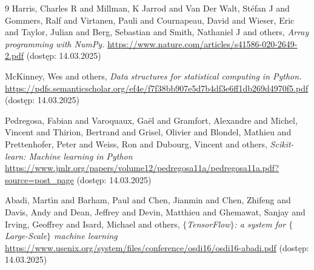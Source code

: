 \documentclass{SGGW-thesis}
\begin{document}
\begin{thebibliography}{9}
Harris, Charles R and Millman, K Jarrod and Van Der Walt, St{\'e}fan J and Gommers, Ralf and Virtanen, Pauli and Cournapeau, David and Wieser, Eric and Taylor, Julian and Berg, Sebastian and Smith, Nathaniel J and others, \textit{Array programming with NumPy.} \url{https://www.nature.com/articles/s41586-020-2649-2.pdf} (dostęp: 14.03.2025)

McKinney, Wes and others, \textit{Data structures for statistical computing in Python.} \url{https://pdfs.semanticscholar.org/ef4e/f7f38bb907e5d7b4df3e6ff1db269d4970f5.pdf} (dostęp: 14.03.2025)

Pedregosa, Fabian and Varoquaux, Ga{\"e}l and Gramfort, Alexandre and Michel, Vincent and Thirion, Bertrand and Grisel, Olivier and Blondel, Mathieu and Prettenhofer, Peter and Weiss, Ron and Dubourg, Vincent and others, \textit{Scikit-learn: Machine learning in Python} \url{https://www.jmlr.org/papers/volume12/pedregosa11a/pedregosa11a.pdf?source=post_page} (dostęp: 14.03.2025)

Abadi, Mart{\'\i}n and Barham, Paul and Chen, Jianmin and Chen, Zhifeng and Davis, Andy and Dean, Jeffrey and Devin, Matthieu and Ghemawat, Sanjay and Irving, Geoffrey and Isard, Michael and others, \textit{$\{$TensorFlow$\}$: a system for $\{$Large-Scale$\}$ machine learning} \url{https://www.usenix.org/system/files/conference/osdi16/osdi16-abadi.pdf} (dostęp: 14.03.2025)
\end{thebibliography}

\beforelastpage
\end{document}
